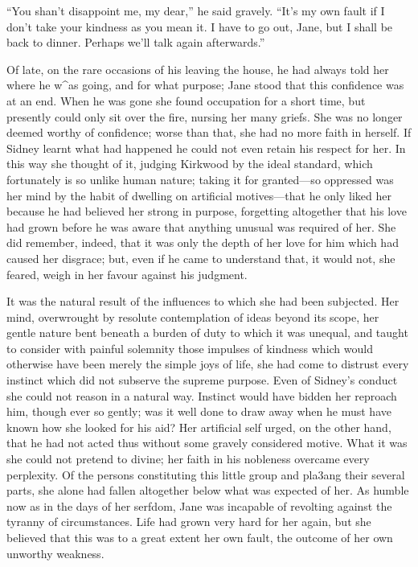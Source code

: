 ``You shan't disappoint me, my dear,'' he said gravely. ``It's my own
fault if I don't take your kindness as you mean it. I have to go out,
Jane, but I shall be back to dinner. Perhaps we'll talk again
afterwards.''

Of late, on the rare occasions of his leaving the house, he had always
told her where he w\^{}as going, and for what purpose; Jane
{\protect\hypertarget{140}{}{}}stood that this confidence was at an end.
When he was gone she found occupation for a short time, but presently
could only sit over the fire, nursing her many griefs. She was no longer
deemed worthy of confidence; worse than that, she had no more faith in
herself. If Sidney learnt what had happened he could not even retain his
respect for her. In this way she thought of it, judging Kirkwood by the
ideal standard, which fortunately is so unlike human nature; taking it
for granted---so oppressed was her mind by the habit of dwelling on
artificial motives---that he only liked her because he had believed her
strong in purpose, forgetting altogether that his love had grown before
he was aware that anything unusual was required of her. She did
remember, indeed, that it was only the depth of her love for him which
had caused her disgrace; but, even if he came to understand that, it
would not, she feared, weigh in her favour against his judgment.

It was the natural result of the influences to which she had been
subjected. Her mind, overwrought by resolute contemplation of ideas
beyond its scope, her gentle nature bent
{\protect\hypertarget{141}{}{}}beneath a burden of duty to which it was
unequal, and taught to consider with painful solemnity those impulses of
kindness which would otherwise have been merely the simple joys of life,
she had come to distrust every instinct which did not subserve the
supreme purpose. Even of Sidney's conduct she could not reason in a
natural way. Instinct would have bidden her reproach him, though ever so
gently; was it well done to draw away when he must have known how she
looked for his aid? Her artificial self urged, on the other hand, that
he had not acted thus without some gravely considered motive. What it
was she could not pretend to divine; her faith in his nobleness overcame
every perplexity. Of the persons constituting this little group and
pla3ang their several parts, she alone had fallen altogether below what
was expected of her. As humble now as in the days of her serfdom, Jane
was incapable of revolting against the tyranny of circumstances. Life
had grown very hard for her again, but she believed that this was to a
great extent her own fault, the outcome of her own unworthy weakness.

